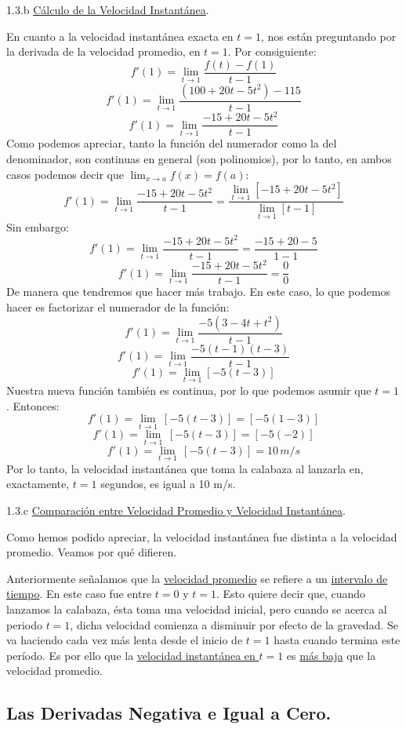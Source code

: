 \documentclass[12pt]{article}
\begin{document}
1.3.b \underline{Cálculo de la Velocidad Instantánea}.

En cuanto a la velocidad instantánea exacta en $t = 1$, nos están preguntando por la derivada de la velocidad promedio, en $t = 1$. Por consiguiente:
\[f'(1) = \lim_{t \to 1} \frac{f(t) - f(1)}{t - 1}\]
\[f'(1) = \lim_{t \to 1} \frac{(100 + 20t - 5t^{2}) - 115}{t - 1}\]
\[f'(1) = \lim_{t \to 1} \frac{-15 + 20t - 5t^{2}}{t - 1}\]
Como podemos apreciar, tanto la función del numerador como la del denominador, son continuas en general (son polinomios), por lo tanto, en ambos casos podemos decir que $\lim_{x \to a} f(x) = f(a)$:
\[f'(1) = \lim_{t \to 1} \frac{-15 + 20t - 5t^{2}}{t - 1} =  \frac{\lim_{t \to 1} [-15 + 20t - 5t^{2}]}{\lim_{t \to 1} [t - 1]}\]
Sin embargo:
\[f'(1) = \lim_{t \to 1} \frac{-15 + 20t - 5t^{2}}{t - 1} = \frac{-15 + 20 - 5}{1 - 1}\]
\[f'(1) = \lim_{t \to 1} \frac{-15 + 20t - 5t^{2}}{t - 1} = \frac{0}{0}\]
De manera que tendremos que hacer más trabajo. En este caso, lo que podemos hacer es factorizar el numerador de la función:
\[f'(1) = \lim_{t \to 1} \frac{-5(3 - 4t + t^{2})}{t - 1}\]
\[f'(1) = \lim_{t \to 1} \frac{-5(t - 1)(t - 3)}{t - 1}\]
\[f'(1) = \lim_{t \to 1} [-5(t - 3)]\]
Nuestra nueva función también es continua, por lo que podemos asumir que $t = 1$. Entonces:
\[f'(1) = \lim_{t \to 1} \, [-5(t - 3)] = [-5(1 - 3)]\]
\[f'(1) = \lim_{t \to 1} \, [-5(t - 3)] = [-5(-2)]\]
\[f'(1) = \lim_{t \to 1} \, [-5(t - 3)] = 10 \, m/s\]
Por lo tanto, la velocidad instantánea que toma la calabaza al lanzarla en, exactamente, $t = 1$ segundos, es igual a 10 m/s.

1.3.c \underline{Comparación entre Velocidad Promedio y Velocidad Instantánea}.

Como hemos podido apreciar, la velocidad instantánea fue distinta a la velocidad promedio. Veamos por qué difieren.

Anteriormente señalamos que la \underline{velocidad promedio} se refiere a un \underline{intervalo de tiempo}. En este caso fue entre $t = 0$ y $t = 1$. Esto quiere decir que, cuando lanzamos la calabaza, ésta toma una velocidad inicial, pero cuando se acerca al periodo $t = 1$, dicha velocidad comienza a disminuir por efecto de la gravedad. Se va haciendo cada vez más lenta desde el inicio de $t = 1$ hasta cuando termina este período. Es por ello que la \underline{velocidad instantánea en $t = 1$} es \underline{más baja} que la velocidad promedio.



\subsection{Las Derivadas Negativa e Igual a Cero.}
\end{document}
